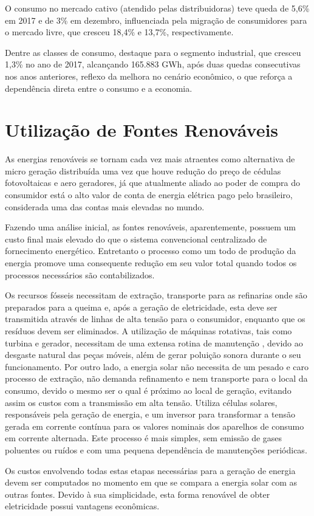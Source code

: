 O consumo no mercado cativo (atendido pelas distribuidoras) teve queda de 5,6\% em 2017 e de 3\% em dezembro, influenciada pela migração de consumidores para o mercado livre, que cresceu 18,4\% e 13,7\%, respectivamente.

Dentre as classes de consumo, destaque para o segmento industrial, que cresceu 1,3\% no ano de 2017, alcançando 165.883 GWh, após duas quedas consecutivas nos anos anteriores, reflexo da melhora no cenário econômico, o que reforça a dependência direta entre o consumo e a economia.

\section{Utilização de Fontes Renováveis}

As energias renováveis se tornam cada vez mais atraentes como alternativa de micro geração distribuída uma vez que houve redução do preço de cédulas fotovoltaicas e aero geradores, já que atualmente aliado ao poder de compra do consumidor está o alto valor de conta de energia elétrica pago pelo brasileiro, considerada uma das contas mais elevadas no mundo. \cite{barbosa2013geraccao}

Fazendo uma análise inicial, as fontes renováveis, aparentemente, possuem um custo final mais elevado do que o sistema convencional centralizado de fornecimento energético. Entretanto o processo como um todo de produção da energia promove uma consequente redução
em seu valor total quando todos os processos necessários são contabilizados.

Os recursos fósseis necessitam de extração, transporte para as refinarias onde são preparados para a queima e, após a geração de eletricidade, esta deve ser transmitida através de linhas de alta tensão para o consumidor, enquanto que os resíduos devem ser eliminados. A utilização de máquinas rotativas, tais como turbina e gerador, necessitam de uma extensa rotina de manutenção , devido ao desgaste natural das peças móveis, além de gerar poluição sonora durante o seu funcionamento. Por outro lado, a energia solar não necessita de um pesado e caro processo de extração, não demanda refinamento e nem transporte para o local da consumo, devido o mesmo ser o qual é próximo ao local de geração, evitando assim os custos com a transmissão em alta tensão. Utiliza células solares, responsáveis pela geração de energia, e um inversor para transformar a tensão gerada em corrente contínua para os valores nominais dos aparelhos de consumo em corrente alternada. Este processo é mais simples, sem emissão de gases poluentes ou ruídos e com uma pequena dependência de manutenções periódicas.\cite{galdino2000contexto}

Os custos envolvendo todas estas etapas necessárias para a geração de
energia devem ser computados no momento em que se compara a energia solar
com as outras fontes. Devido à sua simplicidade, esta forma renovável de obter
eletricidade possui vantagens econômicas. 